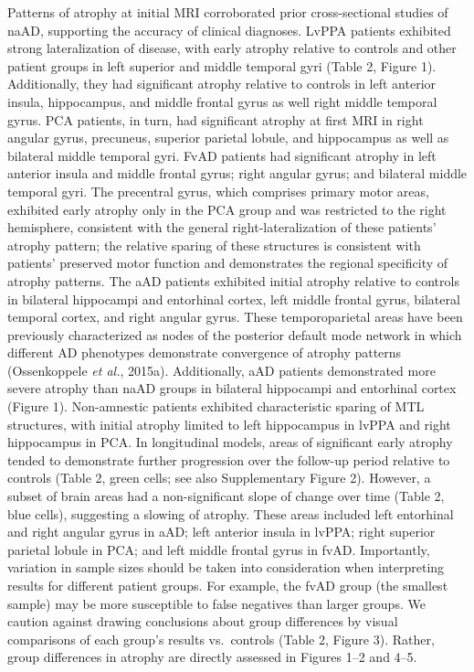 \documentclass[]{article}
\begin{document}
Patterns of atrophy at initial MRI corroborated prior cross-sectional
studies of naAD, supporting the accuracy of clinical diagnoses. LvPPA
patients exhibited strong lateralization of disease, with early atrophy
relative to controls and other patient groups in left superior and
middle temporal gyri (Table 2, Figure 1). Additionally, they had
significant atrophy relative to controls in left anterior insula,
hippocampus, and middle frontal gyrus as well right middle temporal
gyrus. PCA patients, in turn, had significant atrophy at first MRI in
right angular gyrus, precuneus, superior parietal lobule, and
hippocampus as well as bilateral middle temporal gyri. FvAD patients had
significant atrophy in left anterior insula and middle frontal gyrus;
right angular gyrus; and bilateral middle temporal gyri. The precentral
gyrus, which comprises primary motor areas, exhibited early atrophy only
in the PCA group and was restricted to the right hemisphere, consistent
with the general right-lateralization of these patients' atrophy
pattern; the relative sparing of these structures is consistent with
patients' preserved motor function and demonstrates the regional
specificity of atrophy patterns. The aAD patients exhibited initial
atrophy relative to controls in bilateral hippocampi and entorhinal
cortex, left middle frontal gyrus, bilateral temporal cortex, and right
angular gyrus. These temporoparietal areas have been previously
characterized as nodes of the posterior default mode network in which
different AD phenotypes demonstrate convergence of atrophy patterns
(Ossenkoppele \emph{et al.}, 2015a). Additionally, aAD patients
demonstrated more severe atrophy than naAD groups in bilateral
hippocampi and entorhinal cortex (Figure 1). Non-amnestic patients
exhibited characteristic sparing of MTL structures, with initial atrophy
limited to left hippocampus in lvPPA and right hippocampus in PCA. In
longitudinal models, areas of significant early atrophy tended to
demonstrate further progression over the follow-up period relative to
controls (Table 2, green cells; see also Supplementary Figure 2).
However, a subset of brain areas had a non-significant slope of change
over time (Table 2, blue cells), suggesting a slowing of atrophy. These
areas included left entorhinal and right angular gyrus in aAD; left
anterior insula in lvPPA; right superior parietal lobule in PCA; and
left middle frontal gyrus in fvAD. Importantly, variation in sample
sizes should be taken into consideration when interpreting results for
different patient groups. For example, the fvAD group (the smallest
sample) may be more susceptible to false negatives than larger groups.
We caution against drawing conclusions about group differences by visual
comparisons of each group's results vs.~controls (Table 2, Figure 3).
Rather, group differences in atrophy are directly assessed in Figures
1--2 and 4--5.
\end{document}

